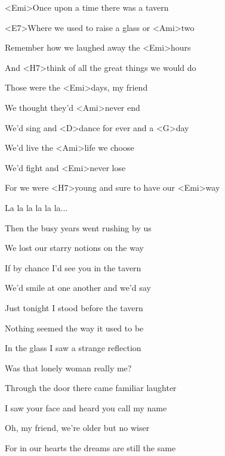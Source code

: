 

\zs
<Emi>Once upon a time there was a tavern

<E7>Where we used to raise a glass or <Ami>two

Remember how we laughed away the <Emi>hours

And <H7>think of all the great things we would do
\ks

\zr
Those were the <Emi>days, my friend

We thought they'd <Ami>never end

We'd sing and <D>dance for ever and a <G>day

We'd live the <Ami>life we choose

We'd fight and <Emi>never lose

For we were <H7>young and sure to have our <Emi>way

La la la la la la...
\kr

\zs
Then the busy years went rushing by us

We lost our starry notions on the way

If by chance I'd see you in the tavern

We'd smile at one another and we'd say
\ks

\zr\kr

\zs
Just tonight I stood before the tavern

Nothing seemed the way it used to be

In the glass I saw a strange reflection

Was that lonely woman really me?
\ks

\zr\kr

\zs
Through the door there came familiar laughter

I saw your face and heard you call my name

Oh, my friend, we're older but no wiser

For in our hearts the dreams are still the same
\ks

\zr\kr

\kp
